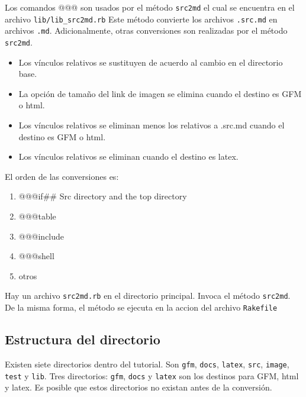Los comandos @@@ son usados por el método \texttt{src2md} el cual se
encuentra en el archivo \texttt{lib/lib\_src2md.rb} Este método
convierte los archivos \texttt{.src.md} en archivos \texttt{.md}.
Adicionalmente, otras conversiones son realizadas por el método
\texttt{src2md}.

\begin{itemize}
\tightlist
\item
  Los vínculos relativos se sustituyen de acuerdo al cambio en el
  directorio base.
\item
  La opción de tamaño del link de imagen se elimina cuando el destino es
  GFM o html.
\item
  Los vínculos relativos se eliminan menos los relativos a .src.md
  cuando el destino es GFM o html.
\item
  Los vínculos relativos se eliminan cuando el destino es latex.
\end{itemize}

El orden de las conversiones es:

\begin{enumerate}
\def\labelenumi{\arabic{enumi}.}
\tightlist
\item
  @@@if\#\# Src directory and the top directory
\item
  @@@table
\item
  @@@include
\item
  @@@shell
\item
  otros
\end{enumerate}

Hay un archivo \texttt{src2md.rb} en el directorio principal. Invoca el
método \texttt{src2md}. De la misma forma, el método se ejecuta en la
accion del archivo \texttt{Rakefile}

\hypertarget{estructura-del-directorio}{%
\subsection{Estructura del directorio}\label{estructura-del-directorio}}

Existen siete directorios dentro del tutorial. Son \texttt{gfm},
\texttt{docs}, \texttt{latex}, \texttt{src}, \texttt{image},
\texttt{test} y \texttt{lib}. Tres directorios: \texttt{gfm},
\texttt{docs} y \texttt{latex} son los destinos para GFM, html y latex.
Es posible que estos directorios no existan antes de la conversión.

